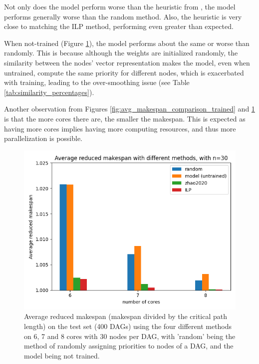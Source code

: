 Not only does the model perform worse than the heuristic from \citet{zhao2020DAGsched},
the model performs generally worse than the random method.
Also, the heuristic is very close to matching the ILP method,
performing even greater than expected.

When not-trained (Figure \ref{fig:avg_makespan_comparison_untrained}), the model performs 
about the same or worse than randomly.
This is because although the weights are initialized randomly,
the similarity between the nodes' vector representation
makes the model, even when untrained, 
compute the same priority for different nodes, which 
is exacerbated with training, leading to the over-smoothing
issue (see Table \ref{tab:similarity_percentages}).

Another observation from Figures \ref{fig:avg_makespan_comparison_trained}
and \ref{fig:avg_makespan_comparison_untrained} is that 
the more cores there are, the smaller the makespan.
This is expected as having more cores implies having more 
computing resources, and thus more parallelization is possible.

\begin{figure}
    \centering
    \includegraphics[width=\linewidth]{images/avg_makespan_n30_untrained.png}
    \caption{Average reduced makespan (makespan divided by the critical path length) on the test set (400 DAGs) using the four different methods
    on 6, 7 and 8 cores with 30 nodes per DAG,
    with 'random' being the method of randomly assigning priorities to nodes of a DAG,
    and the model being not trained.}
    \label{fig:avg_makespan_comparison_untrained}
\end{figure}


